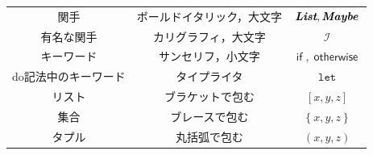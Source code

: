 \documentclass[a4paper,twocolumn]{jsbook}
\newcommand{\mKeyword}[1]{\mathsf{#1}} %
\newcommand{\mVarKeyword}[1]{\texttt{#1}}
\newcommand{\mDoLetKeyword}{\mVarKeyword{let}}
\newcommand{\mIfKeyword}{\mKeyword{if}}
\newcommand{\mOtherwiseKeyword}{\mKeyword{otherwise}}
\DeclareMathOperator{\mIf}{\mIfKeyword}
\DeclareMathOperator{\mOtherwise}{\mOtherwiseKeyword}
\newcommand{\mListWith}[1]{\left[#1\right]}
\newcommand{\mSetWith}[1]{\left\{#1\right\}}
\newcommand{\mTupleWith}[1]{\left(#1\right)}
\newcommand{\mTupleUnboxedWith}[1]{\texttt{(\#}#1\texttt{\#)}}
\newcommand{\mFunctor}[1]{\textit{\textbf{#1}}}
\newcommand{\mSpecialFunctor}[1]{\mathcal{#1}} %
\DeclareMathOperator{\mIFunctor}{\mSpecialFunctor{I}}
\begin{document}
\begin{table}[p]
\begin{center}
\begin{tabular}{||c|c|c||}
関手&ボールドイタリック，大文字&$\mFunctor{List},\mFunctor{Maybe}$\\
有名な関手&カリグラフィ，大文字&$\mIFunctor$\\
\hline
キーワード&サンセリフ，小文字&$\mIf,\mOtherwise$\\
do記法中のキーワード&タイプライタ&$\mDoLetKeyword$\\
\hline
リスト&ブラケットで包む&$\mListWith{x,y,z}$\\
集合&ブレースで包む&$\mSetWith{x,y,z}$\\
タプル&丸括弧で包む&$\mTupleWith{x,y,z}$\\
\hline
\end{tabular}
\end{center}
\end{table}
\end{document}
